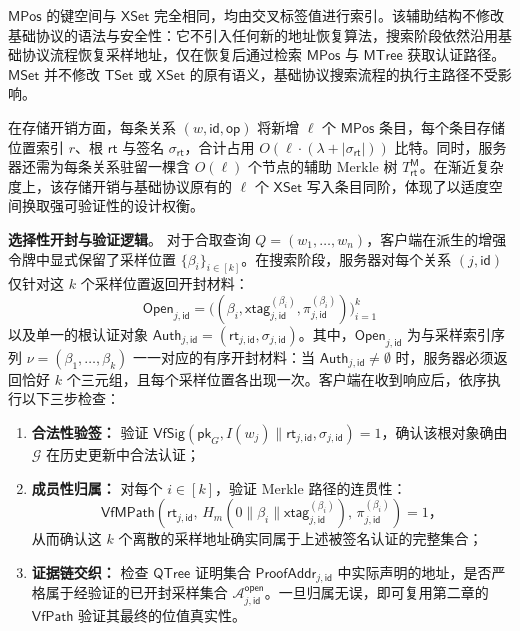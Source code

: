 $\mathsf{MPos}$ 的键空间与 $\mathsf{XSet}$ 完全相同，均由交叉标签值进行索引。该辅助结构不修改基础协议的语法与安全性：它不引入任何新的地址恢复算法，搜索阶段依然沿用基础协议流程恢复采样地址，仅在恢复后通过检索 $\mathsf{MPos}$ 与 $\mathsf{MTree}$ 获取认证路径。$\mathsf{MSet}$ 并不修改 $\mathsf{TSet}$ 或 $\mathsf{XSet}$ 的原有语义，基础协议搜索流程的执行主路径不受影响。

在存储开销方面，每条关系 $(w,\mathsf{id},\mathsf{op})$ 将新增 $\ell$ 个 $\mathsf{MPos}$ 条目，每个条目存储位置索引 $r$、根 $\mathsf{rt}$ 与签名 $\sigma_{\mathsf{rt}}$，合计占用 $O(\ell\cdot(\lambda+|\sigma_{\mathsf{rt}}|))$ 比特。同时，服务器还需为每条关系驻留一棵含 $O(\ell)$ 个节点的辅助 Merkle 树 $T_{\mathsf{rt}}^{\mathsf{M}}$。在渐近复杂度上，该存储开销与基础协议原有的 $\ell$ 个 $\mathsf{XSet}$ 写入条目同阶，体现了以适度空间换取强可验证性的设计权衡。

\textbf{选择性开封与验证逻辑}。
对于合取查询 $Q=(w_1,\ldots,w_n)$，客户端在派生的增强令牌中显式保留了采样位置 $\{\beta_i\}_{i\in[k]}$。在搜索阶段，服务器对每个关系 $(j,\mathsf{id})$ 仅针对这 $k$ 个采样位置返回开封材料：
\begin{equation}\label{eq:commit-open}
\mathsf{Open}_{j,\mathsf{id}}=\big((\beta_i,\mathsf{xtag}_{j,\mathsf{id}}^{(\beta_i)},\pi_{j,\mathsf{id}}^{(\beta_i)})\big)_{i=1}^{k}
\end{equation}
以及单一的根认证对象 $\mathsf{Auth}_{j,\mathsf{id}}=(\mathsf{rt}_{j,\mathsf{id}},\sigma_{j,\mathsf{id}})$。其中，$\mathsf{Open}_{j,\mathsf{id}}$ 为与采样索引序列 $\nu=(\beta_1,\ldots,\beta_k)$ 一一对应的有序开封材料：当 $\mathsf{Auth}_{j,\mathsf{id}}\neq\emptyset$ 时，服务器必须返回恰好 $k$ 个三元组，且每个采样位置各出现一次。客户端在收到响应后，依序执行以下三步检查：
\begin{enumerate}
\item \textbf{合法性验签：} 验证 $\mathsf{VfSig}(\mathsf{pk}_G,I(w_j)\|\mathsf{rt}_{j,\mathsf{id}},\sigma_{j,\mathsf{id}})=1$，确认该根对象确由 $\mathcal{G}$ 在历史更新中合法认证；
\item \textbf{成员性归属：} 对每个 $i\in[k]$，验证 Merkle 路径的连贯性：
\begin{equation}\label{eq:commit-vfmpath}
\mathsf{VfMPath}\!\left(\mathsf{rt}_{j,\mathsf{id}},\,H_m(0\|\beta_i\|\mathsf{xtag}_{j,\mathsf{id}}^{(\beta_i)}),\,\pi_{j,\mathsf{id}}^{(\beta_i)}\right)=1\text{，}
\end{equation}
从而确认这 $k$ 个离散的采样地址确实同属于上述被签名认证的完整集合；
\item \textbf{证据链交织：} 检查 $\mathsf{QTree}$ 证明集合 $\mathsf{ProofAddr}_{j,\mathsf{id}}$ 中实际声明的地址，是否严格属于经验证的已开封采样集合 $\mathcal{A}_{j,\mathsf{id}}^{\mathsf{open}}$。一旦归属无误，即可复用第二章的 $\mathsf{VfPath}$ 验证其最终的位值真实性。
\end{enumerate}

